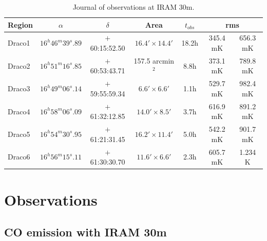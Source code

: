 \documentclass[traditabstract]{aa}
\newcommand{\tfm}[1]{\tablefootmark{#1}}
\begin{document}
\begin{table}[h]
  \centering
  \footnotesize
  \caption{\label{table:rms} Journal of observations at IRAM 30m.}
  \begin{tabular}{lcccccc}
    \hline \hline
    Region &      $\alpha$       &    $\delta$    &        Area         & $t_{obs}$ \tfm{a} & \multicolumn{2}{c}{rms \tfm{b}} \\ \hline 
    Draco1 & $16^h 46^m 39^s.89$ & $+$60:15:52.50 & $16.4'\times 14.4'$ &       18.2h       &    345.4 mK    &    656.3 mK    \\
    Draco2 & $16^h 51^m 16^s.85$ & $+$60:53:43.71 &  157.5 arcmin$^2$   &        8.8h       &    373.1 mK    &    789.8 mK    \\
    Draco3 & $16^h 49^m 06^s.14$ & $+$59:55:59.34 &  $6.6'\times 6.6'$  &        1.1h       &    529.7 mK    &    982.4 mK    \\
    Draco4 & $16^h 58^m 06^s.09$ & $+$61:32:12.85 & $14.0'\times 8.5'$  &        3.7h       &    616.9 mK    &    891.2 mK    \\
    Draco5 & $16^h 54^m 30^s.95$ & $+$61:21:31.45 & $16.2'\times 11.4'$ &        5.0h       &    542.2 mK    &    901.7 mK    \\
    Draco6 & $16^h 56^m 15^s.11$ & $+$61:30:30.70 & $11.6'\times 6.6'$  &        2.3h       &    605.7 mK    &    1.234 K     \\ \hline
  \end{tabular}
\end{table}




\section{Observations}
\label{sec:Obs}

   \subsection{CO emission with IRAM 30m}
\end{document}
